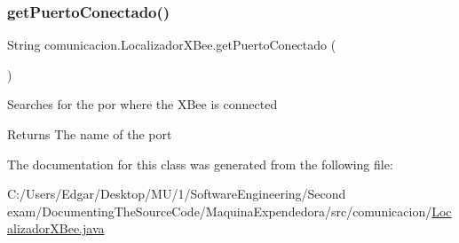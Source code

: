 \subsubsection{\texorpdfstring{get\+Puerto\+Conectado()}{getPuertoConectado()}}
{\footnotesize\ttfamily String comunicacion.\+Localizador\+X\+Bee.\+get\+Puerto\+Conectado (\begin{DoxyParamCaption}{ }\end{DoxyParamCaption})\hspace{0.3cm}{\ttfamily [inline]}}

Searches for the por where the X\+Bee is connected \begin{DoxyReturn}{Returns}
The name of the port 
\end{DoxyReturn}


The documentation for this class was generated from the following file\+:\begin{DoxyCompactItemize}
\item 
C\+:/\+Users/\+Edgar/\+Desktop/\+M\+U/1/\+Software\+Engineering/\+Second exam/\+Documenting\+The\+Source\+Code/\+Maquina\+Expendedora/src/comunicacion/\mbox{\hyperlink{_localizador_x_bee_8java}{Localizador\+X\+Bee.\+java}}\end{DoxyCompactItemize}
